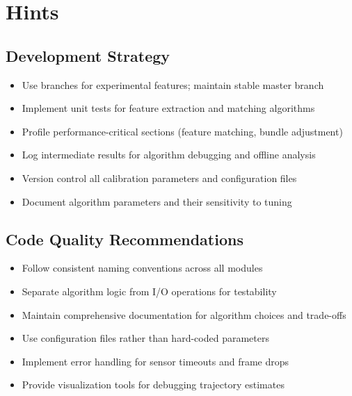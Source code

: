 %
%
%

\chapter{Hints}

\section{Development Strategy}

\begin{itemize}
    \item Use branches for experimental features; maintain stable master branch
    \item Implement unit tests for feature extraction and matching algorithms
    \item Profile performance-critical sections (feature matching, bundle adjustment)
    \item Log intermediate results for algorithm debugging and offline analysis
    \item Version control all calibration parameters and configuration files
    \item Document algorithm parameters and their sensitivity to tuning
\end{itemize}

\section{Code Quality Recommendations}

\begin{itemize}
    \item Follow consistent naming conventions across all modules
    \item Separate algorithm logic from I/O operations for testability
    \item Maintain comprehensive documentation for algorithm choices and trade-offs
    \item Use configuration files rather than hard-coded parameters
    \item Implement error handling for sensor timeouts and frame drops
    \item Provide visualization tools for debugging trajectory estimates
\end{itemize}

